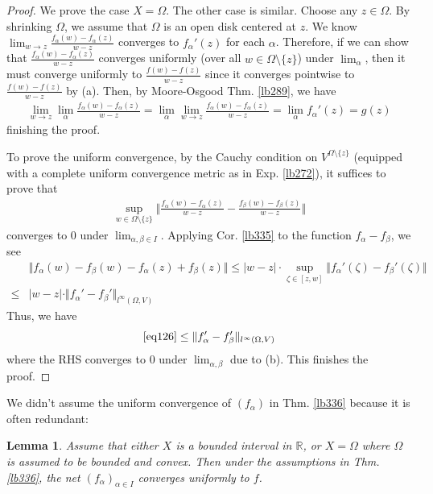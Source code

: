 \documentclass[12pt,b5paper,notitlepage]{article}
\theoremstyle{definition}
\theoremstyle{plain}
\newtheorem{lm}[df]{Lemma}
\newcommand{\Rbb}{\mathbb R}
\numberwithin{equation}{section}
\begin{document}
\begin{proof}
We prove the case $X=\Omega$. The other case is similar. Choose any $z\in \Omega$. By shrinking $\Omega$, we assume that $\Omega$ is an open disk centered at $z$. We know $\lim_{w\rightarrow z}\frac{f_\alpha(w)-f_\alpha(z)}{w-z}$ converges to $f_\alpha'(z)$ for each $\alpha$. Therefore, if we can show that $\frac{f_\alpha(w)-f_\alpha(z)}{w-z}$ converges uniformly (over all $w\in \Omega\setminus\{z\}$) under $\lim_\alpha$, then it must converge uniformly to $\frac{f(w)-f(z)}{w-z}$ since it converges pointwise to $\frac{f(w)-f(z)}{w-z}$ by (a). Then, by Moore-Osgood Thm. \ref{lb289}, we have
\begin{align*}
\lim_{w\rightarrow z}\lim_\alpha\frac{f_\alpha(w)-f_\alpha(z)}{w-z}=\lim_\alpha\lim_{w\rightarrow z}\frac{f_\alpha(w)-f_\alpha(z)}{w-z}=\lim_\alpha f_\alpha'(z)=g(z)
\end{align*}
finishing the proof.

To prove the uniform convergence, by the Cauchy condition on $V^{\Omega\setminus\{z\}}$ (equipped with a complete uniform convergence metric as in Exp. \ref{lb272}), it suffices to prove that
\begin{align}\label{eq126}
\sup_{w\in\Omega\setminus\{z\}}\Big\Vert \frac{f_\alpha(w)-f_\alpha(z)}{w-z}-\frac{f_\beta(w)-f_\beta(z)}{w-z}\Big\Vert
\end{align}
converges to $0$ under $\lim_{\alpha,\beta\in I}$. Applying Cor. \ref{lb335} to the function $f_\alpha-f_\beta$, we see
\begin{align}
&\Vert f_\alpha(w)-f_\beta(w)-f_\alpha(z)+f_\beta(z)\Vert\leq |w-z|\cdot\sup_{\zeta\in[z,w]} \Vert f_\alpha'(\zeta)-f_\beta'(\zeta)\Vert\nonumber\\
\leq&|w-z|\cdot \Vert f_\alpha'-f_\beta'\Vert_{l^\infty(\Omega,V)}\label{eq127}
\end{align}
Thus, we have 
\begin{align*}
\eqref{eq126}\leq \Vert f_\alpha'-f_\beta'\Vert_{l^\infty(\Omega,V)}
\end{align*}
where the RHS converges to $0$ under $\lim_{\alpha,\beta}$ due to (b). This finishes the proof.
\end{proof}


We didn't assume the uniform convergence of $(f_\alpha)$ in Thm. \ref{lb336} because it is often redundant:

\begin{lm}\label{lb343}
Assume that either $X$ is a bounded interval in $\Rbb$, or $X=\Omega$ where $\Omega$ is assumed to be bounded and convex. Then under the assumptions in Thm. \ref{lb336}, the net $(f_\alpha)_{\alpha\in I}$ converges uniformly to $f$. 
\end{lm}
\end{document}
